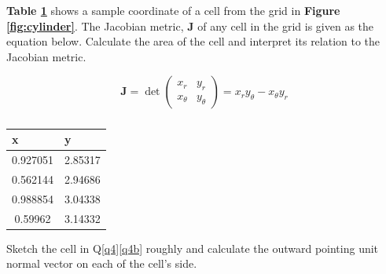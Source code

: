 
\clearpage

\item \label{q4b} \textbf{Table \ref{table:cell}} shows a sample coordinate of a cell from the grid in \textbf{Figure \ref{fig:cylinder}}. The Jacobian metric, $\textbf{J}$ of any cell in the grid is given as the equation below. Calculate the area of the cell and interpret its relation to the Jacobian metric.


\begin{equation}
\textbf{J} = \det\begin{pmatrix} x_{r} & y_{r} \\ x_{\theta} & y_{\theta}  \end{pmatrix} = x_{r}y_{\theta} - x_{\theta}y_{r}
\end{equation}


\renewcommand{\arraystretch}{1.2}	%
\begin{table}[H]
	\centering
	\caption{\jadual}	%
	\begin{tabular}{|c|c|}
		\hline
		\multicolumn{1}{|l|}{\textbf{x}} & \multicolumn{1}{l|}{\textbf{y}} \\
		\hline
0.927051 & 2.85317 \\
0.562144 & 2.94686 \\
0.988854 & 3.04338 \\
0.59962 & 3.14332 \\
		\hline
	\end{tabular}
	\label{table:cell}%
\end{table}%
		
		


\item Sketch the cell in Q\ref{q4}\ref{q4b} roughly and calculate the outward pointing unit normal vector on each of the cell's side.

		


\listclose	%

\clearpage